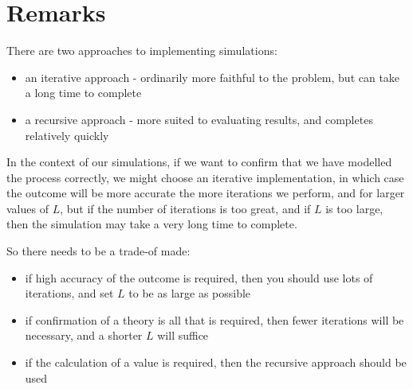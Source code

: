 \section{Remarks}

There are two approaches to implementing simulations: \bigskip

\begin{itemize}
	\item an iterative approach - ordinarily more faithful to the problem, 
	but can take a long time to complete
	\item a recursive approach - more suited to evaluating results, and 
	completes relatively quickly
\end{itemize}\medskip

In the context of our simulations, if we want to confirm that we have 
modelled the process correctly, we might choose an iterative implementation, 
in which case the outcome will be more accurate the more iterations we 
perform, and for larger values of $L$, but if the number of iterations is 
too great, and if $L$ is too large, then the simulation may take a very long 
time to complete. \bigskip

So there needs to be a trade-of made: \bigskip

\begin{itemize}
	\item if high accuracy of the outcome is required, then you should 
	use lots of iterations, and set $L$ to be as large as possible
	\item if confirmation of a theory is all that is required, then 
	fewer iterations will be necessary, and a shorter $L$ will suffice
	\item if the calculation of a value is required, then the recursive 
	approach should be used
\end{itemize}\medskip










